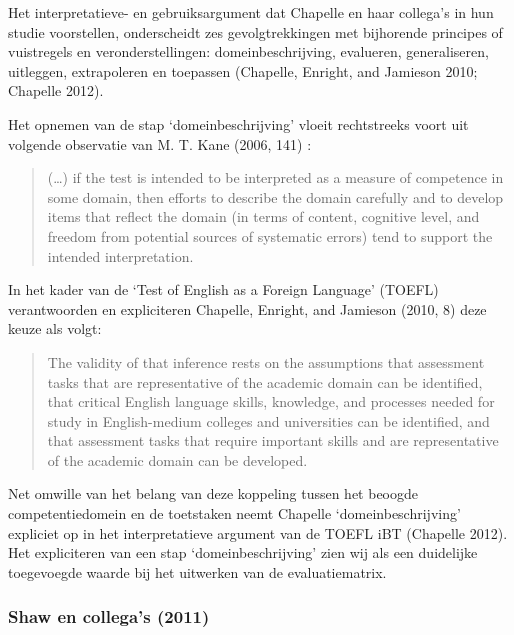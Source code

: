 \documentclass[
  letterpaper,
]{report}
\begin{document}
Het interpretatieve- en gebruiksargument dat Chapelle en haar collega's
in hun studie voorstellen, onderscheidt zes gevolgtrekkingen met
bijhorende principes of vuistregels en veronderstellingen:
domeinbeschrijving, evalueren, generaliseren, uitleggen, extrapoleren en
toepassen (Chapelle, Enright, and Jamieson 2010; Chapelle 2012).

Het opnemen van de stap `domeinbeschrijving' vloeit rechtstreeks voort
uit volgende observatie van M. T. Kane (2006, 141) :

\begin{quote}
(\ldots) if the test is intended to be interpreted as a measure of
competence in some domain, then efforts to describe the domain carefully
and to develop items that reflect the domain (in terms of content,
cognitive level, and freedom from potential sources of systematic
errors) tend to support the intended interpretation.
\end{quote}

In het kader van de `Test of English as a Foreign Language' (TOEFL)
verantwoorden en expliciteren Chapelle, Enright, and Jamieson (2010, 8)
deze keuze als volgt:

\begin{quote}
The validity of that inference rests on the assumptions that assessment
tasks that are representative of the academic domain can be identified,
that critical English language skills, knowledge, and processes needed
for study in English-medium colleges and universities can be identified,
and that assessment tasks that require important skills and are
representative of the academic domain can be developed.
\end{quote}

Net omwille van het belang van deze koppeling tussen het beoogde
competentiedomein en de toetstaken neemt Chapelle `domeinbeschrijving'
expliciet op in het interpretatieve argument van de TOEFL iBT (Chapelle
2012). Het expliciteren van een stap `domeinbeschrijving' zien wij als
een duidelijke toegevoegde waarde bij het uitwerken van de
evaluatiematrix.

\hypertarget{shaw-en-collegas-2011}{%
\subsubsection*{Shaw en collega's (2011)}\label{shaw-en-collegas-2011}}
\end{document}
